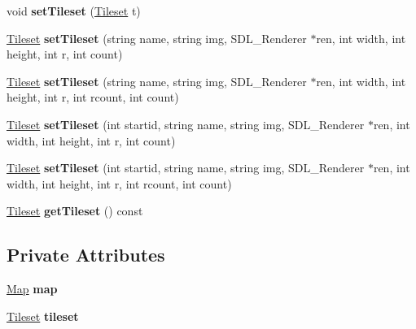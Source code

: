 \begin{DoxyCompactItemize}
\item 
void {\bfseries set\+Tileset} (\hyperlink{classTileset}{Tileset} t)\hypertarget{classLevel_a684434ce7be09c5956e6a93a08b5076f}{}\label{classLevel_a684434ce7be09c5956e6a93a08b5076f}

\item 
\hyperlink{classTileset}{Tileset} {\bfseries set\+Tileset} (string name, string img, S\+D\+L\+\_\+\+Renderer $\ast$ren, int width, int height, int r, int count)\hypertarget{classLevel_af2efc35f43fcfba60a0dd5a43e412c2e}{}\label{classLevel_af2efc35f43fcfba60a0dd5a43e412c2e}

\item 
\hyperlink{classTileset}{Tileset} {\bfseries set\+Tileset} (string name, string img, S\+D\+L\+\_\+\+Renderer $\ast$ren, int width, int height, int r, int rcount, int count)\hypertarget{classLevel_a6e1874e8e365179362e6caf3c60d707a}{}\label{classLevel_a6e1874e8e365179362e6caf3c60d707a}

\item 
\hyperlink{classTileset}{Tileset} {\bfseries set\+Tileset} (int startid, string name, string img, S\+D\+L\+\_\+\+Renderer $\ast$ren, int width, int height, int r, int count)\hypertarget{classLevel_ae735629e2ed290aa68545acb67ad3877}{}\label{classLevel_ae735629e2ed290aa68545acb67ad3877}

\item 
\hyperlink{classTileset}{Tileset} {\bfseries set\+Tileset} (int startid, string name, string img, S\+D\+L\+\_\+\+Renderer $\ast$ren, int width, int height, int r, int rcount, int count)\hypertarget{classLevel_a92388f78f651f7aea81d39f227c1cae3}{}\label{classLevel_a92388f78f651f7aea81d39f227c1cae3}

\item 
\hyperlink{classTileset}{Tileset} {\bfseries get\+Tileset} () const \hypertarget{classLevel_af6e51b47f493d8282b6648ec9e4054a3}{}\label{classLevel_af6e51b47f493d8282b6648ec9e4054a3}

\end{DoxyCompactItemize}
\subsection*{Private Attributes}
\begin{DoxyCompactItemize}
\item 
\hyperlink{classMap}{Map} {\bfseries map}\hypertarget{classLevel_acd59c9055fdd6c15b0a1adf6e451f0ba}{}\label{classLevel_acd59c9055fdd6c15b0a1adf6e451f0ba}

\item 
\hyperlink{classTileset}{Tileset} {\bfseries tileset}\hypertarget{classLevel_a7f2da1fccdb1b0dd6742649f3367324b}{}\label{classLevel_a7f2da1fccdb1b0dd6742649f3367324b}

\end{DoxyCompactItemize}


